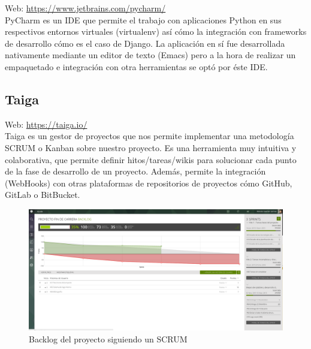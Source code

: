 Web: \url{https://www.jetbrains.com/pycharm/}\\

PyCharm es un IDE que permite el trabajo con aplicaciones Python en sus respectivos entornos virtuales (virtualenv) así cómo la integración con frameworks de desarrollo cómo es el caso de Django. La aplicación en sí fue desarrollada nativamente mediante un editor de texto (Emacs) pero a la hora de realizar un empaquetado e integración con otra herramientas se optó por éste IDE. \\

\subsection{Taiga}


Web: \url{https://taiga.io/}\\

Taiga es un gestor de proyectos que nos permite implementar una metodología SCRUM o Kanban sobre nuestro proyecto. Es una herramienta muy intuitiva y colaborativa, que permite definir hitos/tareas/wikis para solucionar cada punto de la fase de desarrollo de un proyecto. Además, permite la integración (WebHooks) con otras plataformas de repositorios de proyectos cómo GitHub, GitLab o BitBucket. \\
\begin{figure}[H]
\includegraphics[scale=0.235]{diagramas/taiga-backlog.png}
\caption{Backlog del proyecto siguiendo un SCRUM}
\end{figure}

